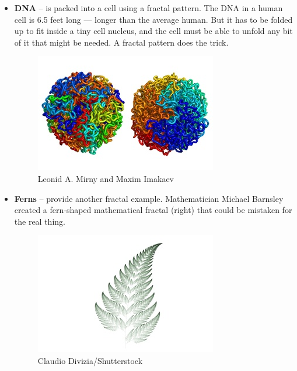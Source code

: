 \documentclass{article}
\begin{document}
\begin{itemize}
\item \textbf{DNA} -- is packed into a cell using a fractal pattern. The DNA in a human cell is 6.5 feet long — longer than the average human. But it has to be folded up to fit inside a tiny cell nucleus, and the cell must be able to unfold any bit of it that might be needed. A fractal pattern does the trick.
\begin{figure}[H]
\centering
\includegraphics[scale=1.3]{DSC-B0818_11.jpg}
\caption{Leonid A. Mirny and Maxim Imakaev}
\end{figure}

\item \textbf{Ferns} -- provide another fractal example. Mathematician Michael Barnsley created a fern-shaped mathematical fractal (right) that could be mistaken for the real thing.
\begin{figure}[H]
\centering
\includegraphics[scale=1.3]{DSC-B0818_08.jpg}
\caption{Claudio Divizia/Shutterstock}
\end{figure}


\end{itemize}
\end{document}
